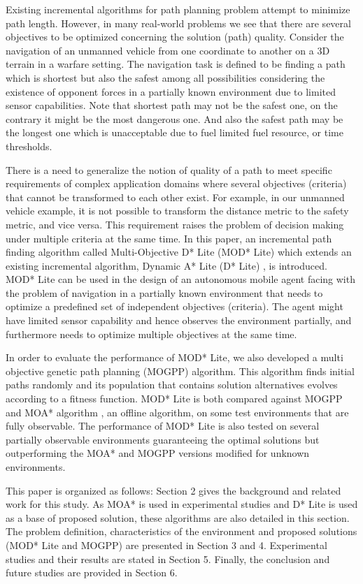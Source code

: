 \documentclass[10pt,journal]{IEEEtran}
\begin{document}
Existing incremental algorithms for path planning problem attempt to minimize path length. However, in many real-world problems we see that there are several objectives to be optimized concerning the solution (path) quality. Consider the navigation of an unmanned vehicle from one coordinate to another on a 3D terrain in a warfare setting. The navigation task is defined to be finding a path which is shortest but also the safest among all possibilities considering the existence of opponent forces in a partially known environment due to limited sensor capabilities. Note that shortest path may not be the safest one, on the contrary it might be the most dangerous one. And also the safest path may be the longest one which is unacceptable due to fuel limited fuel resource, or time thresholds. 

There is a need to generalize the notion of quality of a path to meet specific requirements of complex application domains where several objectives (criteria) that cannot be transformed to each other exist. For example, in our unmanned vehicle example, it is not possible to transform the distance metric to the safety metric, and vice versa. This requirement raises the problem of  decision making under multiple criteria at the same time. In this paper, an incremental path finding algorithm called Multi-Objective D* Lite (MOD* Lite) which extends an existing incremental algorithm, Dynamic A* Lite (D* Lite) \cite{Koenig:2002}, is introduced. MOD* Lite \cite{Oral:2012} can be used in the design of an autonomous mobile agent facing with the problem of navigation in a partially known environment that needs to optimize a predefined set of independent objectives (criteria). The agent might have limited sensor capability and hence observes the environment partially, and furthermore needs to optimize multiple objectives at the same time.

In order to evaluate the performance of  MOD* Lite, we also developed a  multi objective genetic path planning (MOGPP) algorithm. This algorithm finds initial paths randomly and its population that contains solution alternatives evolves according to a fitness function. MOD* Lite is both compared against MOGPP and MOA* algorithm \cite{MOAStewart:1991}, an offline algorithm, on some test environments that are fully observable. The performance of MOD* Lite is also tested on several partially observable environments guaranteeing the optimal solutions but outperforming the MOA* and MOGPP versions modified for unknown environments.

This paper is organized as follows: Section 2 gives the background and related work for this study. As MOA* is used in experimental studies and D* Lite is used as a base of proposed solution, these algorithms are also detailed in this section. The problem definition, characteristics of the environment and proposed solutions (MOD* Lite and MOGPP) are presented in Section 3 and 4. Experimental studies and their results are stated in Section 5. Finally, the conclusion and future studies are provided in Section 6.
\end{document}
